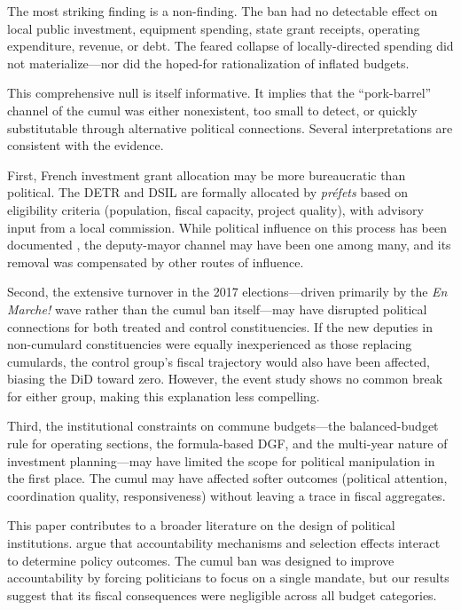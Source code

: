 \documentclass[12pt]{article}
\begin{document}
The most striking finding is a non-finding. The ban had no detectable effect on local public investment, equipment spending, state grant receipts, operating expenditure, revenue, or debt. The feared collapse of locally-directed spending did not materialize---nor did the hoped-for rationalization of inflated budgets.

This comprehensive null is itself informative. It implies that the ``pork-barrel'' channel of the cumul was either nonexistent, too small to detect, or quickly substitutable through alternative political connections. Several interpretations are consistent with the evidence.

First, French investment grant allocation may be more bureaucratic than political. The DETR and DSIL are formally allocated by \textit{préfets} based on eligibility criteria (population, fiscal capacity, project quality), with advisory input from a local commission. While political influence on this process has been documented \citep{enikolopov2014politics}, the deputy-mayor channel may have been one among many, and its removal was compensated by other routes of influence.

Second, the extensive turnover in the 2017 elections---driven primarily by the \textit{En Marche!} wave rather than the cumul ban itself---may have disrupted political connections for both treated and control constituencies. If the new deputies in non-cumulard constituencies were equally inexperienced as those replacing cumulards, the control group's fiscal trajectory would also have been affected, biasing the DiD toward zero. However, the event study shows no common break for either group, making this explanation less compelling.

Third, the institutional constraints on commune budgets---the balanced-budget rule for operating sections, the formula-based DGF, and the multi-year nature of investment planning---may have limited the scope for political manipulation in the first place. The cumul may have affected softer outcomes (political attention, coordination quality, responsiveness) without leaving a trace in fiscal aggregates.

This paper contributes to a broader literature on the design of political institutions. \citet{besley2004political} argue that accountability mechanisms and selection effects interact to determine policy outcomes. The cumul ban was designed to improve accountability by forcing politicians to focus on a single mandate, but our results suggest that its fiscal consequences were negligible across all budget categories.
\end{document}
